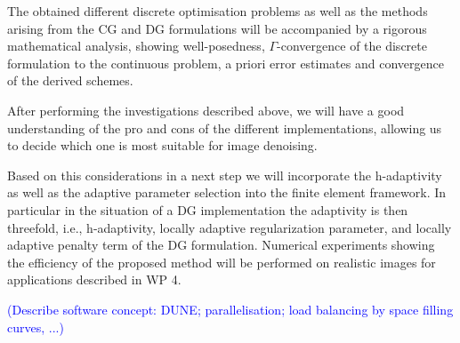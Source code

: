 \documentclass[enabledeprecatedfontcommands,cleardoublepage=empty,headsepline,twoside,11pt,DIV=15,BCOR=12mm,final]{scrartcl}
\begin{document}
  The obtained different discrete optimisation problems as well as the methods arising from the CG and DG formulations will be accompanied by a rigorous mathematical analysis, showing well-posedness,  $\Gamma$-convergence of the discrete formulation to the continuous problem, a priori error estimates and convergence of the derived schemes.
  
  After performing the investigations described above, we will have a good understanding of the pro and cons of the different implementations, allowing us to decide which one is most suitable for image denoising. 

Based on this considerations in a next step we will incorporate the h-adaptivity as well as the adaptive parameter selection into the finite element framework. In particular in the situation of a DG implementation the adaptivity is then threefold, i.e., h-adaptivity, locally adaptive regularization parameter, and locally adaptive penalty term of the DG formulation. Numerical experiments showing the efficiency of the proposed method will be performed on realistic images for applications described in WP 4. %

\textcolor{blue}{(Describe software concept: DUNE; parallelisation; load balancing by space filling curves, ...)}

  
\end{document}
